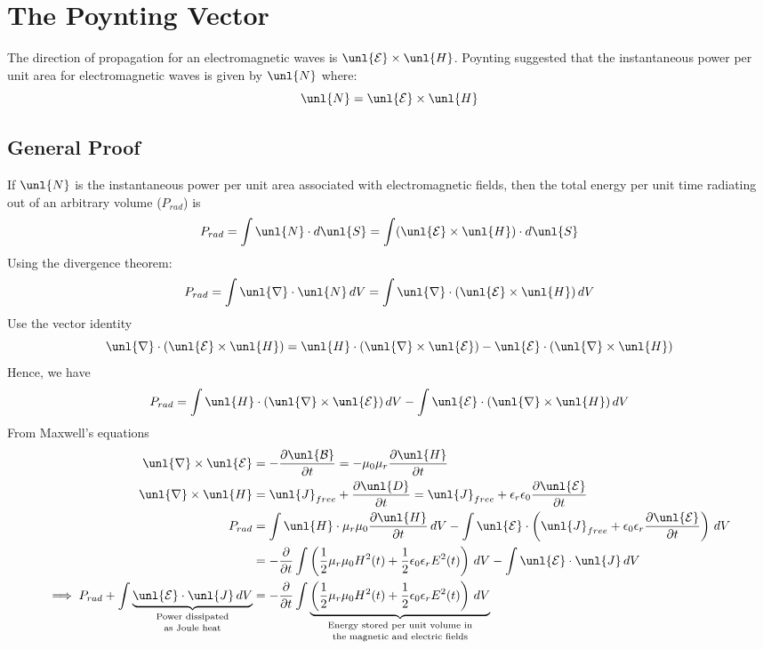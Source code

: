 \documentclass[a4paper, 11pt, normalem]{report}
\newcommand\p{\partial}
\newcommand\E{\mathcal{E}}
\newcommand\uE{\unl{\E}}
\newcommand\B{\mathcal{B}}
\newcommand\uB{\unl{\B}}
\newcommand\del{\unl{\nabla}}
\newcommand\eno{\epsilon_0}
\newcommand\J{\unl{J}}
\newcommand\er{\epsilon_r}
\begin{document}
\section{The Poynting Vector}
The direction of propagation for an electromagnetic waves is $\uE\times\unl{H}$.
Poynting suggested that the instantaneous power per unit area for electromagnetic waves is given by $\unl{N}$ where:
\begin{equation}
	\unl{N} = \uE\times\unl{H}
\end{equation}
\subsection{General Proof}
If $\unl{N}$ is the instantaneous power per unit area associated with electromagnetic fields, then the total energy per unit time radiating out of an arbitrary volume ($P_{rad}$) is
\begin{equation}
	P_{rad} = \int \unl{N}\cdot d\unl{S} = \int (\uE\times\unl{H})\cdot d\unl{S}
\end{equation}
Using the divergence theorem:
\begin{equation}
	P_{rad} = \int \del\cdot\unl{N}\,dV = \int \del\cdot(\uE\times\unl{H})\,dV
\end{equation}
Use the vector identity
\begin{equation}
	\del\cdot(\uE\times\unl{H}) = \unl{H}\cdot(\del\times\uE) - \uE\cdot(\del\times\unl{H})
\end{equation}
Hence, we have
\begin{equation}
	P_{rad} = \int \unl{H}\cdot(\del\times\uE)\,dV - \int \uE\cdot(\del\times\unl{H})\,dV
\end{equation}
From Maxwell's equations
\begin{align}
	\del\times\uE &= -\frac{\p\uB}{\p t} = -\mu_0\mu_r\frac{\p\unl{H}}{\p t} \\
	\del\times\unl{H} &= \J_{free} + \frac{\p \unl{D}}{\p t} = \J_{free} + \er\eno\frac{\p\uE}{\p t} \\
	P_{rad} &= \int \unl{H}\cdot\mu_r\mu_0\frac{\p\unl{H}}{\p t}\,dV - \int \uE\cdot\left(\J_{free} + \eno\er\frac{\p\uE}{\p t}\right)\,dV \\
	&= -\frac{\p}{\p t}\int \left(\frac{1}{2}\mu_r\mu_0H^2(t) + \frac{1}{2}\eno\er E^2(t)\right)\,dV - \int \uE\cdot\J\,dV \\
	\implies P_{rad} + \int \underbrace{\uE\cdot\J\,dV}_{\text{\shortstack{Power dissipated \\ as Joule heat}}} &= -\frac{\p}{\p t}\int \underbrace{\left(\frac{1}{2}\mu_r\mu_0H^2(t) + \frac{1}{2}\eno\er E^2(t)\right)\,dV}_{\text{\shortstack{Energy stored per unit volume in \\ the magnetic and electric fields}}}
\end{align}
\end{document}
